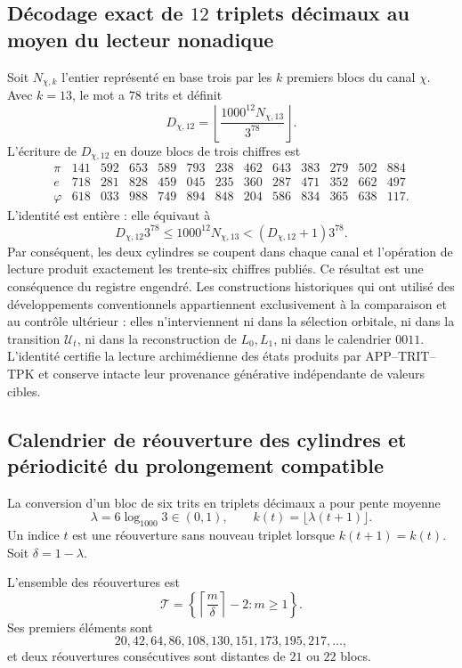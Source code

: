 \subsection{Décodage exact de \(12\) triplets décimaux au moyen du lecteur nonadique}

Soit \(N_{\chi,k}\) l'entier représenté en base trois par les \(k\) premiers
blocs du canal \(\chi\). Avec \(k=13\), le mot a \(78\) trits et
définit
\[
D_{\chi,12}
=\left\lfloor\frac{1000^{12}N_{\chi,13}}{3^{78}}\right\rfloor.
\]
L'écriture de \(D_{\chi,12}\) en douze blocs de trois chiffres est
\[
\begin{array}{c|rrrrrrrrrrrr}
\pi&141&592&653&589&793&238&462&643&383&279&502&884\\
e&718&281&828&459&045&235&360&287&471&352&662&497\\
\varphi&618&033&988&749&894&848&204&586&834&365&638&117.
\end{array}
\]
L'identité est entière : elle équivaut à
\[
D_{\chi,12}3^{78}
\le 1000^{12}N_{\chi,13}
<(D_{\chi,12}+1)3^{78}.
\]
Par conséquent, les deux cylindres se coupent dans chaque canal et l'opération de
lecture produit exactement les trente-six chiffres publiés. Ce
résultat est une conséquence du registre engendré. Les constructions
historiques qui ont utilisé des développements conventionnels appartiennent exclusivement
à la comparaison et au contrôle ultérieur : elles n'interviennent ni dans la sélection
orbitale, ni dans la transition \(\mathcal U_t\), ni dans la reconstruction de
\(L_0,L_1\), ni dans le calendrier \(0011\). L'identité certifie la lecture
archimédienne des états produits par APP--TRIT--TPK et conserve intacte
leur provenance générative indépendante de valeurs cibles.

\subsection{Calendrier de réouverture des cylindres et périodicité du prolongement compatible}

La conversion d'un bloc de six trits en triplets décimaux a pour pente
moyenne
\[
\lambda=6\log_{1000}3\in(0,1),
\qquad k(t)=\lfloor\lambda(t+1)\rfloor.
\]
Un indice \(t\) est une réouverture sans nouveau triplet lorsque
\(k(t+1)=k(t)\). Soit \(\delta=1-\lambda\).

\begin{theorem}
\label{thm:calendario-beatty}
L'ensemble des réouvertures est
\[
\mathcal T=
\left\{\left\lceil\frac{m}{\delta}\right\rceil-2:m\ge1\right\}.
\]
Ses premiers éléments sont
\[
20,42,64,86,108,130,151,173,195,217,\ldots,
\]
et deux réouvertures consécutives sont distantes de \(21\) ou \(22\) blocs.
\end{theorem}


